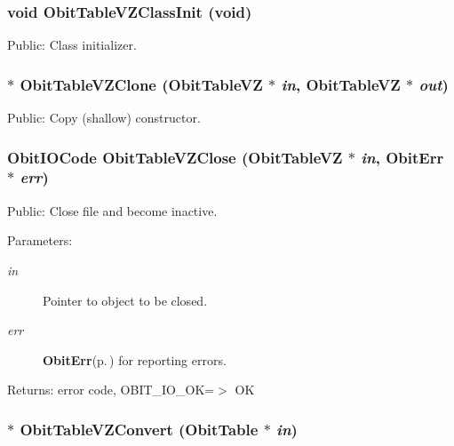 \subsubsection{\setlength{\rightskip}{0pt plus 5cm}void Obit\-Table\-VZClass\-Init (void)}\label{ObitTableVZ_8h_a10}


Public: Class initializer. 

\subsubsection{$\ast$ Obit\-Table\-VZClone ({\bf Obit\-Table\-VZ} $\ast$ {\em in}, {\bf Obit\-Table\-VZ} $\ast$ {\em out})}\label{ObitTableVZ_8h_a15}


Public: Copy (shallow) constructor. 

\subsubsection{\setlength{\rightskip}{0pt plus 5cm}Obit\-IOCode Obit\-Table\-VZClose ({\bf Obit\-Table\-VZ} $\ast$ {\em in}, {\bf Obit\-Err} $\ast$ {\em err})}\label{ObitTableVZ_8h_a21}


Public: Close file and become inactive. 

\begin{Desc}
\item[Parameters:]
\begin{description}
\item[{\em in}]Pointer to object to be closed. \item[{\em err}]{\bf Obit\-Err}{\rm (p.\,\pageref{structObitErr})} for reporting errors. \end{description}
\end{Desc}
\begin{Desc}
\item[Returns:]error code, OBIT\_\-IO\_\-OK=$>$ OK \end{Desc}
\subsubsection{$\ast$ Obit\-Table\-VZConvert ({\bf Obit\-Table} $\ast$ {\em in})}\label{ObitTableVZ_8h_a16}


